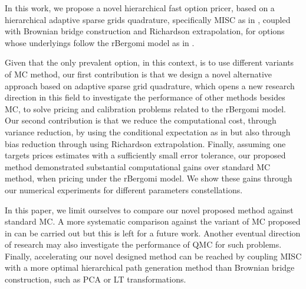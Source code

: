 In this work,  we propose a novel hierarchical fast option pricer,  based on a  hierarchical adaptive sparse grids quadrature, specifically  MISC as in  \cite{haji2016multi}, coupled with Brownian bridge construction and Richardson extrapolation, for options whose underlyings  follow the rBergomi model as in \cite{bayer2016pricing}. 



Given that the only prevalent option, in this context, is to use different variants of MC method, our first contribution  is that we design a novel alternative approach based on  adaptive sparse grid quadrature, which opens a new research direction in this field to investigate the performance of other methods besides MC, to solve pricing and calibration problems related to the rBergomi model. Our second contribution is that we reduce the computational cost, through variance reduction,  by using the conditional expectation as in \cite{mccrickerd2017turbocharging} but also through bias reduction through using Richardson extrapolation. Finally, assuming one targets prices estimates with a sufficiently small error tolerance, our proposed method demonstrated substantial computational gains  over standard MC method, when pricing under the rBergomi model. We show  these gains through our numerical experiments for  different parameters constellations. 

In this paper, we limit ourselves to compare our novel proposed method against standard MC. A more systematic comparison against the variant of MC proposed in \cite{mccrickerd2017turbocharging}  can be carried out but this is left for a future work. Another  eventual direction of research may also investigate the performance of QMC for such problems. Finally, accelerating  our novel designed method can be reached  by coupling MISC with a more optimal hierarchical path generation method than Brownian bridge construction, such as PCA or LT transformations.